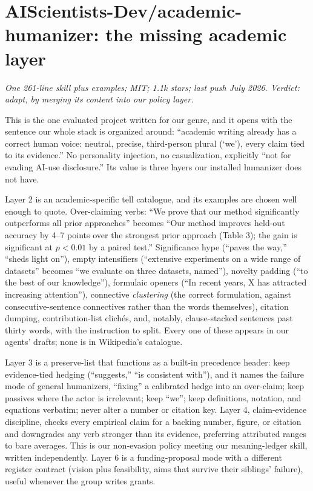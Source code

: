 \section{AIScientists-Dev/academic-humanizer: the missing academic layer}
\label{sec:oss-academic}

\emph{One 261-line skill plus examples; MIT; 1.1k stars; last push July
2026. Verdict: adapt, by merging its content into our policy layer.}

This is the one evaluated project written for our genre, and it opens with
the sentence our whole stack is organized around: ``academic writing
already has a correct human voice: neutral, precise, third-person plural
(`we'), every claim tied to its evidence.'' No personality injection, no
casualization, explicitly ``not for evading AI-use disclosure.'' Its value
is three layers our installed humanizer does not have.

Layer 2 is an academic-specific tell catalogue, and its examples are chosen
well enough to quote. Over-claiming verbs: ``We prove that our method
significantly outperforms all prior approaches'' becomes ``Our method
improves held-out accuracy by 4--7 points over the strongest prior approach
(Table 3); the gain is significant at $p<0.01$ by a paired test.''
Significance hype (``paves the way,'' ``sheds light on''), empty
intensifiers (``extensive experiments on a wide range of datasets'' becomes
``we evaluate on three datasets, named''), novelty padding (``to the best
of our knowledge''), formulaic openers (``In recent years, X has attracted
increasing attention''), connective \emph{clustering} (the correct
formulation, against consecutive-sentence connectives rather than the words
themselves), citation dumping, contribution-list clich\'es, and, notably,
clause-stacked sentences past thirty words, with the instruction to split.
Every one of these appears in our agents' drafts; none is in Wikipedia's
catalogue.

Layer 3 is a preserve-list that functions as a built-in precedence header:
keep evidence-tied hedging (``suggests,'' ``is consistent with''), and it
names the failure mode of general humanizers, ``fixing'' a calibrated hedge
into an over-claim; keep passives where the actor is irrelevant; keep
``we''; keep definitions, notation, and equations verbatim; never alter a
number or citation key. Layer 4, claim-evidence discipline, checks every
empirical claim for a backing number, figure, or citation and downgrades
any verb stronger than its evidence, preferring attributed ranges to bare
averages. This is our non-evasion policy meeting our meaning-ledger skill,
written independently. Layer 6 is a funding-proposal mode with a different
register contract (vision plus feasibility, aims that survive their
siblings' failure), useful whenever the group writes grants.

